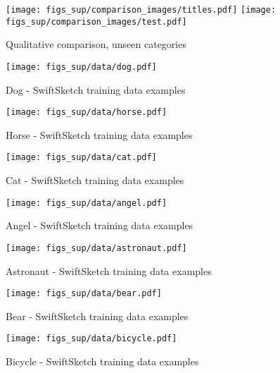 {\begin{figure*}
    \centering
    \texttt{[image: figs\_sup/comparison\_images/titles.pdf]}
    \texttt{[image: figs\_sup/comparison\_images/test.pdf]}
    \caption{Qualitative comparison, unseen categories}
    \label{fig:comparison_test}
\end{figure*}



 
\begin{figure*}
    \centering
    \texttt{[image: figs\_sup/data/dog.pdf]}
    \caption{Dog - SwiftSketch training data examples }
    \label{fig:dog}
\end{figure*}

\begin{figure*}
    \centering
    \texttt{[image: figs\_sup/data/horse.pdf]}
    \caption{Horse - SwiftSketch training data examples }
    \label{fig:horse}
\end{figure*}

\begin{figure*}
    \centering
    \texttt{[image: figs\_sup/data/cat.pdf]}
    \caption{Cat - SwiftSketch training data examples}
    \label{fig:cat}
\end{figure*}

\begin{figure*}
    \centering
    \texttt{[image: figs\_sup/data/angel.pdf]}
    \caption{Angel - SwiftSketch training data examples}
    \label{fig:angle}
\end{figure*}

\begin{figure*}
    \centering
    \texttt{[image: figs\_sup/data/astronaut.pdf]}
    \caption{Astronaut - SwiftSketch training data examples}
    \label{fig:astronaut}
\end{figure*}

\begin{figure*}
    \centering
    \texttt{[image: figs\_sup/data/bear.pdf]}
    \caption{Bear - SwiftSketch training data examples}
    \label{fig:bear}
\end{figure*}

\begin{figure*}
    \centering
    \texttt{[image: figs\_sup/data/bicycle.pdf]}
    \caption{Bicycle - SwiftSketch training data examples}
    \label{fig:bicycle}
\end{figure*}

}

